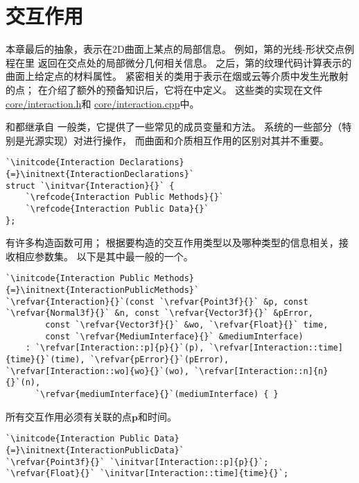 \section{交互作用}\label{sec:交互作用}

本章最后的抽象，表示在2D曲面上某点的局部信息。
例如，第的光线-形状交点例程在里
返回在交点处的局部微分几何相关信息。
之后，第的纹理代码计算表示的曲面上给定点的材料属性。
紧密相关的类用于表示在烟或云等介质中发生光散射的点；
在介绍了额外的预备知识后，它将在中定义。
这些类的实现在文件\href{https://github.com/mmp/pbrt-v3/tree/master/src/core/interaction.h}{\ttfamily core/interaction.h}和
\href{https://github.com/mmp/pbrt-v3/tree/master/src/core/interaction.cpp}{\ttfamily core/interaction.cpp}中。

和都继承自
一般类，它提供了一些常见的成员变量和方法。
系统的一些部分（特别是光源实现）对进行操作，
而曲面和介质相互作用的区别对其并不重要。

\begin{lstlisting}
`\initcode{Interaction Declarations}{=}\initnext{InteractionDeclarations}`
struct `\initvar{Interaction}{}` {
    `\refcode{Interaction Public Methods}{}`
    `\refcode{Interaction Public Data}{}`
};
\end{lstlisting}

有许多构造函数可用；
根据要构造的交互作用类型以及哪种类型的信息相关，接收相应参数集。
以下是其中最一般的一个。
\begin{lstlisting}
`\initcode{Interaction Public Methods}{=}\initnext{InteractionPublicMethods}`
`\refvar{Interaction}{}`(const `\refvar{Point3f}{}` &p, const `\refvar{Normal3f}{}` &n, const `\refvar{Vector3f}{}` &pError,
        const `\refvar{Vector3f}{}` &wo, `\refvar{Float}{}` time,
        const `\refvar{MediumInterface}{}` &mediumInterface)
    : `\refvar[Interaction::p]{p}{}`(p), `\refvar[Interaction::time]{time}{}`(time), `\refvar{pError}{}`(pError), `\refvar[Interaction::wo]{wo}{}`(wo), `\refvar[Interaction::n]{n}{}`(n),
      `\refvar{mediumInterface}{}`(mediumInterface) { }
\end{lstlisting}

所有交互作用必须有关联的点$\bm p$和时间。
\begin{lstlisting}
`\initcode{Interaction Public Data}{=}\initnext{InteractionPublicData}`
`\refvar{Point3f}{}` `\initvar[Interaction::p]{p}{}`;
`\refvar{Float}{}` `\initvar[Interaction::time]{time}{}`;
\end{lstlisting}

